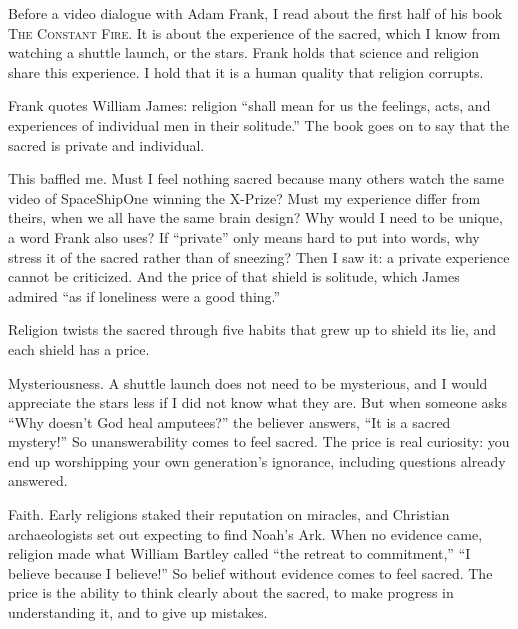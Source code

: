 
Before a video dialogue with Adam Frank, I read about the first half of his book \textsc{The Constant Fire}. It is about the experience of the sacred, which I know from watching a shuttle launch, or the stars. Frank holds that science and religion share this experience. I hold that it is a human quality that religion corrupts.

Frank quotes William James: religion ``shall mean for us the feelings, acts, and experiences of individual men in their solitude.'' The book goes on to say that the sacred is private and individual. 

This baffled me. Must I feel nothing sacred because many others watch the same video of SpaceShipOne winning the X-Prize? Must my experience differ from theirs, when we all have the same brain design? Why would I need to be unique, a word Frank also uses? If ``private'' only means hard to put into words, why stress it of the sacred rather than of sneezing? Then I saw it: a private experience cannot be criticized. And the price of that shield is solitude, which James admired ``as if loneliness were a good thing.'' 

Religion twists the sacred through five habits that grew up to shield its lie, and each shield has a price.

Mysteriousness. A shuttle launch does not need to be mysterious, and I would appreciate the stars less if I did not know what they are. But when someone asks ``Why doesn't God heal amputees?'' the believer answers, ``It is a sacred mystery!'' So unanswerability comes to feel sacred. The price is real curiosity: you end up worshipping your own generation's ignorance, including questions already answered.

Faith. Early religions staked their reputation on miracles, and Christian archaeologists set out expecting to find Noah's Ark. When no evidence came, religion made what William Bartley called ``the retreat to commitment,'' ``I believe because I believe!'' So belief without evidence comes to feel sacred. The price is the ability to think clearly about the sacred, to make progress in understanding it, and to give up mistakes. 

